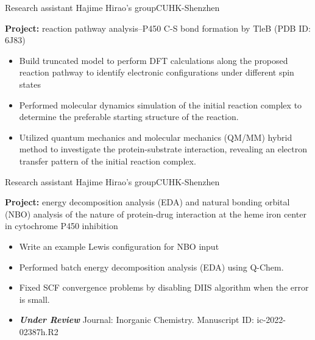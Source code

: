 \documentclass[12pt,a4paper,sans]{moderncv}
\begin{document}
    {Research assistant}{}
    {Hajime Hirao's group}{CUHK-Shenzhen}
    {\small
    \textbf{Project:} reaction pathway analysis--P450 C-S bond formation by TleB (PDB ID: 6J83)
    \begin{itemize}[itemsep=2pt]
        \item Build truncated model to perform DFT calculations along the proposed reaction pathway to
        identify electronic configurations under different spin states
        \item Performed molecular dynamics simulation of the initial reaction complex to determine the preferable starting
        structure of the reaction.
        \item Utilized quantum mechanics and molecular mechanics (QM/MM) hybrid method to investigate the
        protein-substrate interaction, revealing an electron transfer pattern of the initial reaction complex.
    \end{itemize}
}

    {Research assistant}{}
    {Hajime Hirao's group}{CUHK-Shenzhen}
    {\small
    \textbf{Project:} energy decomposition analysis (EDA) and natural bonding orbital (NBO) analysis of
    the nature of protein-drug interaction at the heme iron center in cytochrome P450 inhibition
    \begin{itemize}[itemsep=2pt]
        \item Write an example Lewis configuration for NBO input
        \item Performed batch energy decomposition analysis (EDA) using Q-Chem.
        \item Fixed SCF convergence problems by disabling DIIS algorithm when the error is small.
        \item \textbf{\textit{Under Review}} Journal: Inorganic Chemistry. Manuscript ID: ic-2022-02387h.R2
    \end{itemize}
}
\end{document}
